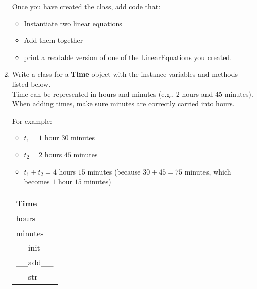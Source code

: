 \documentclass{article}
\begin{document}
\begin{enumerate}
		Once you have created the class, add code that:
		\begin{itemize}
			\item Instantiate two linear equations
			\item Add them together
			\item print a readable version of one of the LinearEquations you created.
		\end{itemize}



	\item
		Write a class for a \textbf{Time} object with the instance variables and methods listed 
		below.\\
		Time can be represented in hours and minutes (e.g., 2 hours and 45 minutes). \\
		When adding times, make sure minutes are correctly carried into hours.

		\begin{minipage}[t]{0.65\textwidth}
			For example:
			\begin{itemize}
				\item $t_1 = 1$ hour $30$ minutes
				\item $t_2 = 2$ hours $45$ minutes
				\item $t_1 + t_2 = 4$ hours $15$ minutes 
					(because $30 + 45 = 75$ minutes, which becomes $1$ hour $15$ minutes)
			\end{itemize}

		\end{minipage}
		\hfill
		\begin{minipage}[t]{0.32\textwidth}
			\vspace{.2em}
			\begin{flushright}
				\begin{tabular}{|l|}
					\hline
					Time \\ \hline
					hours \\
					minutes \\ \hline
					\_\_init\_\_ \\
					\_\_add\_\_ \\
					\_\_str\_\_ \\ \hline
				\end{tabular}
			\end{flushright}
		\end{minipage}
		

\end{enumerate}
\end{document}
